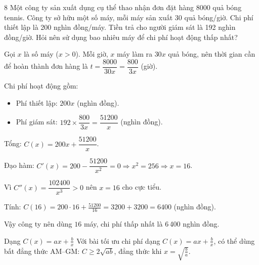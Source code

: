 \separator

\begin{baitoan}{8 \hfill {}}
Một công ty sản xuất dụng cụ thể thao nhận đơn đặt hàng 8000 quả bóng tennis. Công ty sở hữu một số máy, mỗi máy sản xuất 30 quả bóng/giờ. Chi phí thiết lập là 200 nghìn đồng/máy. Tiền trả cho người giám sát là 192 nghìn đồng/giờ. Hỏi nên sử dụng bao nhiêu máy để chi phí hoạt động thấp nhất?
\end{baitoan}

\begin{loigiai}
Gọi $x$ là số máy ($x > 0$). Mỗi giờ, $x$ máy làm ra $30x$ quả bóng, nên thời gian cần để hoàn thành đơn hàng là $t = \dfrac{8000}{30x} = \dfrac{800}{3x}$ (giờ).

Chi phí hoạt động gồm:
\begin{itemize}
  \item Phí thiết lập: $200x$ (nghìn đồng).
  \item Phí giám sát: $192 \times \dfrac{800}{3x} = \dfrac{51200}{x}$ (nghìn đồng).
\end{itemize}

Tổng: $C(x) = 200x + \dfrac{51200}{x}$.

Đạo hàm: $C'(x) = 200 - \dfrac{51200}{x^2} = 0 \Rightarrow x^2 = 256 \Rightarrow x = 16$.

Vì $C''(x) = \dfrac{102400}{x^3} > 0$ nên $x = 16$ cho cực tiểu.


Tính: $C(16) = 200 \cdot 16 + \frac{51200}{16} = 3200 + 3200 = 6400$ (nghìn đồng).

Vậy công ty nên dùng $\boxed{16}$ máy, chi phí thấp nhất là 6\,400 nghìn đồng.
\end{loigiai}

\begin{meobotui}{Dạng $C(x) = ax + \frac{b}{x}$}
Với bài tối ưu chi phí dạng $C(x) = ax + \frac{b}{x}$, có thể dùng bất đẳng thức AM--GM: $C \ge 2\sqrt{ab}$, đẳng thức khi $x = \sqrt{\frac{b}{a}}$.
\end{meobotui}
